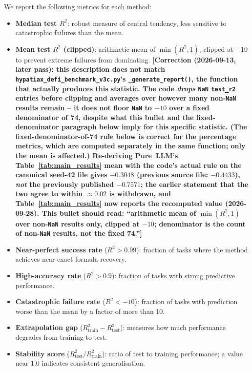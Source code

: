\documentclass[twoside,11pt]{article}
\newcommand{\Rsq}{R^{2}}
\newcommand{\Rtrain}{R^{2}_{\mathrm{train}}}
\newcommand{\Rtest}{R^{2}_{\mathrm{test}}}
\begin{document}
We report the following metrics for each method:
\begin{itemize}
  \item \textbf{Median test $\Rsq$}: robust measure of central tendency, less
    sensitive to catastrophic failures than the mean.
  \item \textbf{Mean test $\Rsq$ (clipped)}: arithmetic mean of $\min(\Rsq, 1)$,
    clipped at $-10$ to prevent extreme failures from dominating.
    \textbf{[Correction (2026-09-13, later pass): this description does not
    match \texttt{hypatiax\_defi\_benchmark\_v3c.py}'s
    \texttt{\_generate\_report()}, the function that actually produces this
    statistic. The code \emph{drops} \texttt{NaN} \texttt{test\_r2} entries
    before clipping and averages over however many non-\texttt{NaN} results
    remain -- it does not floor \texttt{NaN} to $-10$ over a fixed
    denominator of 74, despite what this bullet and the
    fixed-denominator paragraph below imply for this specific statistic.
    (The fixed-denominator-of-74 rule below is correct for the percentage
    metrics, which are computed separately in the same function; only the
    mean is affected.) Re-deriving Pure~LLM's Table~\ref{tab:main_results}
    mean with the code's actual rule on the canonical seed-42 file gives
    $-0.3048$ (previous source file: $-0.4433$), \emph{not} the previously published $-0.7571$; the earlier
    statement that the two agree to within $\approx 0.02$ is withdrawn, and
    Table~\ref{tab:main_results} now reports the recomputed value (2026-09-28).
    This bullet
    should read: ``arithmetic mean of $\min(\Rsq,1)$ over non-\texttt{NaN}
    results only, clipped at $-10$; denominator is the count of non-\texttt{NaN}
    results, not the fixed 74.'']}
  \item \textbf{Near-perfect success rate} ($\Rsq > 0.99$): fraction of tasks where
    the method achieves near-exact formula recovery.
  \item \textbf{High-accuracy rate} ($\Rsq > 0.9$): fraction of tasks with strong
    predictive performance.
  \item \textbf{Catastrophic failure rate} ($\Rsq < -10$): fraction of tasks with
    prediction worse than the mean by a factor of more than 10.
  \item \textbf{Extrapolation gap} ($\Rtrain - \Rtest$): measures how much
    performance degrades from training to test.
  \item \textbf{Stability score} ($\Rtest / \Rtrain$): ratio of test to training
    performance; a value near 1.0 indicates consistent generalisation.
\end{itemize}
\end{document}
